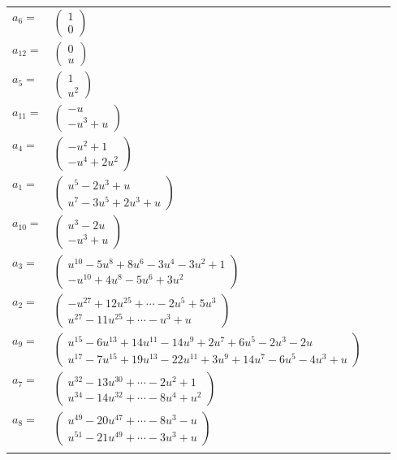 \documentclass[1p]{elsarticle_modified}
\theoremstyle{definition}
\begin{document}
\begin{tabular}{m{7pt} m{180pt} m{7pt} m{180pt} }
\flushright $a_{6}=$&$\begin{pmatrix}1\\0\end{pmatrix}$ \\
\flushright $a_{12}=$&$\begin{pmatrix}0\\u\end{pmatrix}$ \\
\flushright $a_{5}=$&$\begin{pmatrix}1\\u^2\end{pmatrix}$ \\
\flushright $a_{11}=$&$\begin{pmatrix}- u\\- u^3+u\end{pmatrix}$ \\
\flushright $a_{4}=$&$\begin{pmatrix}- u^2+1\\- u^4+2 u^2\end{pmatrix}$ \\
\flushright $a_{1}=$&$\begin{pmatrix}u^5-2 u^3+u\\u^7-3 u^5+2 u^3+u\end{pmatrix}$ \\
\flushright $a_{10}=$&$\begin{pmatrix}u^3-2 u\\- u^3+u\end{pmatrix}$ \\
\flushright $a_{3}=$&$\begin{pmatrix}u^{10}-5 u^8+8 u^6-3 u^4-3 u^2+1\\- u^{10}+4 u^8-5 u^6+3 u^2\end{pmatrix}$ \\
\flushright $a_{2}=$&$\begin{pmatrix}- u^{27}+12 u^{25}+\cdots-2 u^5+5 u^3\\u^{27}-11 u^{25}+\cdots- u^3+u\end{pmatrix}$ \\
\flushright $a_{9}=$&$\begin{pmatrix}u^{15}-6 u^{13}+14 u^{11}-14 u^9+2 u^7+6 u^5-2 u^3-2 u\\u^{17}-7 u^{15}+19 u^{13}-22 u^{11}+3 u^9+14 u^7-6 u^5-4 u^3+u\end{pmatrix}$ \\
\flushright $a_{7}=$&$\begin{pmatrix}u^{32}-13 u^{30}+\cdots-2 u^2+1\\u^{34}-14 u^{32}+\cdots-8 u^4+u^2\end{pmatrix}$ \\
\flushright $a_{8}=$&$\begin{pmatrix}u^{49}-20 u^{47}+\cdots-8 u^3- u\\u^{51}-21 u^{49}+\cdots-3 u^3+u\end{pmatrix}$\\&\end{tabular}
\end{document}
